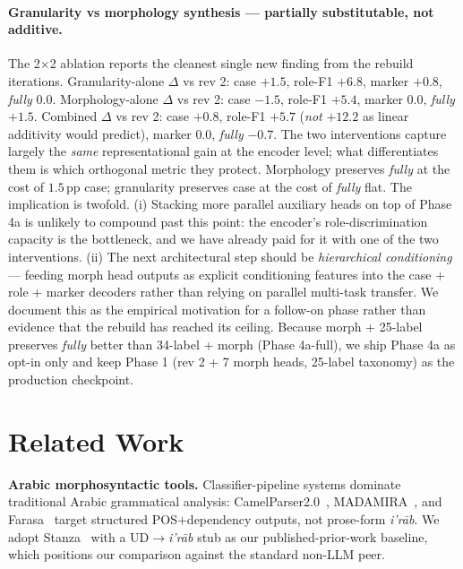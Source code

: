 \documentclass[10pt,a4paper,twocolumn]{article}
\newcommand{\irab}{\textit{i'r{\=a}b}}
\begin{document}
\paragraph{Granularity vs morphology synthesis --- partially substitutable, not additive.}
\label{sec:phase4a:synthesis}
The 2$\times$2 ablation reports the cleanest single new finding from the rebuild iterations. Granularity-alone $\Delta$ vs rev 2: case $+1.5$, role-F1 $+6.8$, marker $+0.8$, \emph{fully} $0.0$. Morphology-alone $\Delta$ vs rev 2: case $-1.5$, role-F1 $+5.4$, marker $0.0$, \emph{fully} $+1.5$. Combined $\Delta$ vs rev 2: case $+0.8$, role-F1 $+\mathbf{5.7}$ (\emph{not} $+12.2$ as linear additivity would predict), marker $0.0$, \emph{fully} $-0.7$. The two interventions capture largely the \emph{same} representational gain at the encoder level; what differentiates them is which orthogonal metric they protect. Morphology preserves \emph{fully} at the cost of $1.5$\,pp case; granularity preserves case at the cost of \emph{fully} flat. The implication is twofold. (i) Stacking more parallel auxiliary heads on top of Phase 4a is unlikely to compound past this point: the encoder's role-discrimination capacity is the bottleneck, and we have already paid for it with one of the two interventions. (ii) The next architectural step should be \emph{hierarchical conditioning} --- feeding morph head outputs as explicit conditioning features into the case + role + marker decoders rather than relying on parallel multi-task transfer. We document this as the empirical motivation for a follow-on phase rather than evidence that the rebuild has reached its ceiling. Because morph + 25-label preserves \emph{fully} better than 34-label + morph (Phase 4a-full), we ship Phase 4a as opt-in only and keep Phase 1 (rev 2 + 7 morph heads, 25-label taxonomy) as the production checkpoint.

\section{Related Work}
\label{sec:related}

\textbf{Arabic morphosyntactic tools.}
Classifier-pipeline systems dominate traditional Arabic grammatical analysis: CamelParser2.0~\cite{elshabrawy2023camelparser}, MADAMIRA~\cite{pasha2014madamira}, and Farasa~\cite{abdelali2016farasa} target structured POS$+$dependency outputs, not prose-form \irab{}. We adopt Stanza~\cite{qi2020stanza} with a UD$\rightarrow$\irab{} stub as our published-prior-work baseline, which positions our comparison against the standard non-LLM peer.
\end{document}
